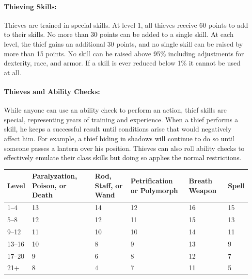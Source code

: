 \begin{multicols}{2}
\paragraph{Thieving Skills:} Thieves are trained in special skills.  At level 1, all thieves receive 60 points to add to their skills.  No more than 30 points can be added to a single skill.  At each level, the thief gains an additional 30 points, and no single skill can be raised by more than 15 points.  No skill can be raised above 95\% including adjustments for dexterity, race, and armor.  If a skill is ever reduced below 1\% it cannot be used at all.  

\paragraph{Thieves and Ability Checks:} While anyone can use an ability check to perform an action, thief skills are special, representing years of training and experience.  When a thief performs a skill, he keeps a successful result until conditions arise that would negatively affect him.  For example, a thief hiding in shadows will continue to do so until someone passes a lantern over his position.  Thieves can also roll ability checks to effectively emulate their class skills but doing so applies the normal restrictions.

\end{multicols}

\noindent
\begin{minipage}{\columnwidth}

\label{roguesaves}
\noindent
\begin{tabular}{|m{}|m{}|m{}|m{}|m{}|m{}|}
\hline
Level	& Paralyzation, Poison, or Death	& Rod, Staff, or Wand	& Petrification or Polymorph	& Breath Weapon	& Spell \\
\hline\hline
\rowcolor[gray]{.9}1--4		& 13	& 14	& 12	& 16	& 15 \\
5--8		& 12	& 12	& 11	& 15	& 13 \\
\rowcolor[gray]{.9}9--12	& 11	& 10	& 10	& 14	& 11 \\
13--16	& 10	& 8		& 9		& 13	& 9 \\
\rowcolor[gray]{.9}17--20	& 9		& 6		& 8		& 12	& 7 \\
21+		& 8		& 4		& 7		& 11	& 5 \\
\hline
\end{tabular}

\end{minipage}

